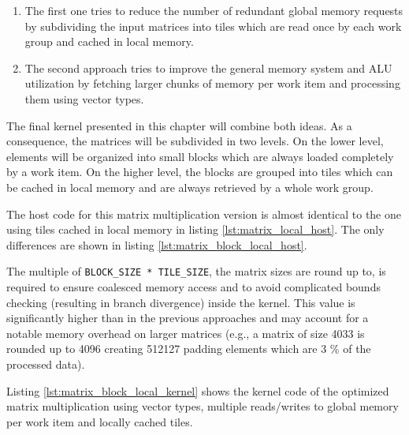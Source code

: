 \begin{enumerate}
\item The first one tries to reduce the number of redundant global memory requests by subdividing the input matrices into tiles which are read once by each work group and cached in local memory.
\item The second approach tries to improve the general memory system and ALU utilization by fetching larger chunks of memory per work item and processing them using vector types.
\end{enumerate}

The final kernel presented in this chapter will combine both ideas.
As a consequence, the matrices will be subdivided in two levels. On the lower level, elements will be organized into small blocks which are always loaded completely by a work item. On the higher level, the blocks are grouped into tiles which can be cached in local memory and are always retrieved by a whole work group.

The host code for this matrix multiplication version is almost identical to the one using tiles cached in local memory in listing \ref{lst:matrix_local_host}. The only differences are shown in listing \ref{lst:matrix_block_local_host}.



The multiple of \lstinline!BLOCK_SIZE * TILE_SIZE!, the matrix sizes are round up to, is required to ensure coalesced memory access and to avoid complicated bounds checking (resulting in branch divergence) inside the kernel. This value is significantly higher than in the previous approaches and may account for a notable memory overhead on larger matrices (e.g., a matrix of size 4033 is rounded up to 4096 creating 512127 padding elements which are 3 \% of the processed data).

Listing \ref{lst:matrix_block_local_kernel} shows the kernel code of the optimized matrix multiplication using vector types, multiple reads/writes to global memory per work item and locally cached tiles.



